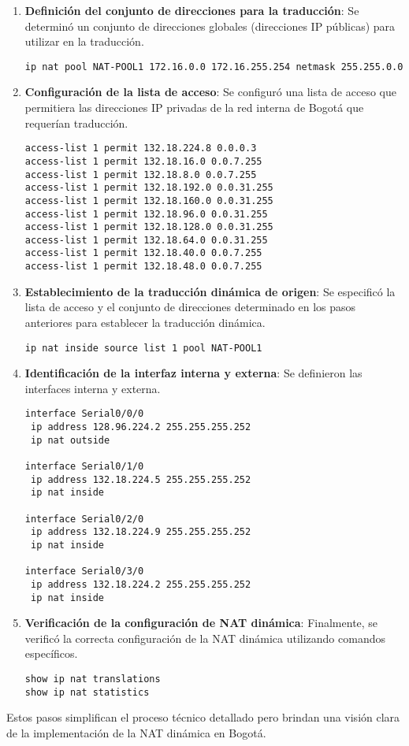 \begin{enumerate}
    \item \textbf{Definición del conjunto de direcciones para la traducción}: Se determinó un conjunto de direcciones globales (direcciones IP públicas) para utilizar en la traducción.
          \begin{verbatim}
ip nat pool NAT-POOL1 172.16.0.0 172.16.255.254 netmask 255.255.0.0
\end{verbatim}

    \item \textbf{Configuración de la lista de acceso}: Se configuró una lista de acceso que permitiera las direcciones IP privadas de la red interna de Bogotá que requerían traducción.
          \begin{verbatim}
access-list 1 permit 132.18.224.8 0.0.0.3
access-list 1 permit 132.18.16.0 0.0.7.255
access-list 1 permit 132.18.8.0 0.0.7.255
access-list 1 permit 132.18.192.0 0.0.31.255
access-list 1 permit 132.18.160.0 0.0.31.255
access-list 1 permit 132.18.96.0 0.0.31.255
access-list 1 permit 132.18.128.0 0.0.31.255
access-list 1 permit 132.18.64.0 0.0.31.255
access-list 1 permit 132.18.40.0 0.0.7.255
access-list 1 permit 132.18.48.0 0.0.7.255
\end{verbatim}

    \item \textbf{Establecimiento de la traducción dinámica de origen}: Se especificó la lista de acceso y el conjunto de direcciones determinado en los pasos anteriores para establecer la traducción dinámica.
          \begin{verbatim}
ip nat inside source list 1 pool NAT-POOL1
\end{verbatim}

    \item \textbf{Identificación de la interfaz interna y externa}: Se definieron las interfaces interna y externa.
          \begin{verbatim}
interface Serial0/0/0
 ip address 128.96.224.2 255.255.255.252
 ip nat outside

interface Serial0/1/0
 ip address 132.18.224.5 255.255.255.252
 ip nat inside

interface Serial0/2/0
 ip address 132.18.224.9 255.255.255.252
 ip nat inside

interface Serial0/3/0
 ip address 132.18.224.2 255.255.255.252
 ip nat inside

\end{verbatim}

    \item \textbf{Verificación de la configuración de NAT dinámica}: Finalmente, se verificó la correcta configuración de la NAT dinámica utilizando comandos específicos.
          \begin{verbatim}
show ip nat translations
show ip nat statistics
\end{verbatim}
\end{enumerate}

Estos pasos simplifican el proceso técnico detallado pero brindan una visión clara de la implementación de la NAT dinámica en Bogotá.

